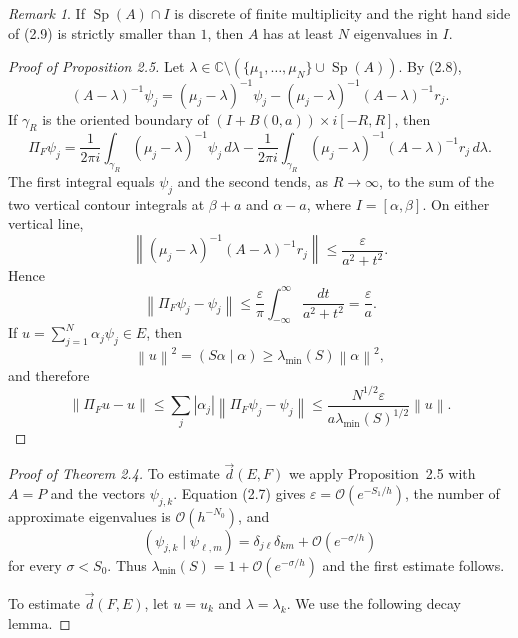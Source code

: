 \documentclass[11pt,a4paper]{article}
\newcommand{\C}{\mathbb C}
\newcommand{\Sp}{\operatorname{Sp}}
\newcommand{\cO}{\mathcal O}
\newcommand{\eps}{\varepsilon}
\newcommand{\norm}[1]{\left\lVert #1\right\rVert}
\newcommand{\ip}[2]{\left(#1\mid #2\right)}
\newcommand{\dvec}{\overset{\rightarrow}{d}}
\numberwithin{equation}{section}
\theoremstyle{remark}
\newtheorem{remark}[theorem]{Remark}
\begin{document}
\begin{remark}
If $\Sp(A)\cap I$ is discrete of finite multiplicity and the right hand side of (2.9) is strictly smaller than $1$, then $A$ has at least $N$ eigenvalues in $I$.
\end{remark}

\begin{proof}[Proof of Proposition 2.5]
Let $\lambda\in\C\setminus(\{\mu_1,\ldots,\mu_N\}\cup\Sp(A))$. By (2.8),
\begin{equation}
(A-\lambda)^{-1}\psi_j=(\mu_j-\lambda)^{-1}\psi_j
-(\mu_j-\lambda)^{-1}(A-\lambda)^{-1}r_j.
\end{equation}
If $\gamma_R$ is the oriented boundary of $(I+B(0,a))\times i[-R,R]$, then
\[
\Pi_F\psi_j=\frac1{2\pi i}\int_{\gamma_R}(\mu_j-\lambda)^{-1}\psi_j\,d\lambda
-\frac1{2\pi i}\int_{\gamma_R}(\mu_j-\lambda)^{-1}(A-\lambda)^{-1}r_j\,d\lambda.
\]
The first integral equals $\psi_j$ and the second tends, as $R\to\infty$, to the sum of the two vertical contour integrals at $\beta+a$ and $\alpha-a$, where $I=[\alpha,\beta]$. On either vertical line,
\[
\norm{(\mu_j-\lambda)^{-1}(A-\lambda)^{-1}r_j}\le\frac{\eps}{a^2+t^2}.
\]
Hence
\[
\norm{\Pi_F\psi_j-\psi_j}\le\frac\eps\pi\int_{-\infty}^{\infty}\frac{dt}{a^2+t^2}=\frac\eps a.
\]
If $u=\sum_{j=1}^N\alpha_j\psi_j\in E$, then
\[
\norm u^2=(S\alpha\mid\alpha)\ge\lambda_{\min}(S)\norm\alpha^2,
\]
and therefore
\[
\norm{\Pi_Fu-u}\le\sum_j|\alpha_j|\norm{\Pi_F\psi_j-\psi_j}
\le\frac{N^{1/2}\eps}{a\lambda_{\min}(S)^{1/2}}\norm u.
\]
\end{proof}

\begin{proof}[Proof of Theorem 2.4]
To estimate $\dvec(E,F)$ we apply Proposition~2.5 with $A=P$ and the vectors $\psi_{j,k}$. Equation (2.7) gives $\eps=\cO(e^{-S_1/h})$, the number of approximate eigenvalues is $\cO(h^{-N_0})$, and
\[
\ip{\psi_{j,k}}{\psi_{\ell,m}}=\delta_{j\ell}\delta_{km}+\cO(e^{-\sigma/h})
\]
for every $\sigma<S_0$. Thus $\lambda_{\min}(S)=1+\cO(e^{-\sigma/h})$ and the first estimate follows.

To estimate $\dvec(F,E)$, let $u=u_k$ and $\lambda=\lambda_k$. We use the following decay lemma.
\end{proof}
\end{document}
